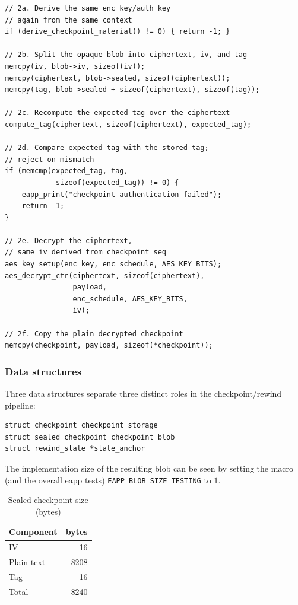 \documentclass[11pt,a4paper]{report}
\begin{document}
\begin{verbatim}
// 2a. Derive the same enc_key/auth_key 
// again from the same context
if (derive_checkpoint_material() != 0) { return -1; }

// 2b. Split the opaque blob into ciphertext, iv, and tag
memcpy(iv, blob->iv, sizeof(iv));
memcpy(ciphertext, blob->sealed, sizeof(ciphertext));
memcpy(tag, blob->sealed + sizeof(ciphertext), sizeof(tag));

// 2c. Recompute the expected tag over the ciphertext
compute_tag(ciphertext, sizeof(ciphertext), expected_tag);

// 2d. Compare expected tag with the stored tag; 
// reject on mismatch
if (memcmp(expected_tag, tag, 
            sizeof(expected_tag)) != 0) {
    eapp_print("checkpoint authentication failed");
    return -1;
}

// 2e. Decrypt the ciphertext,
// same iv derived from checkpoint_seq
aes_key_setup(enc_key, enc_schedule, AES_KEY_BITS);
aes_decrypt_ctr(ciphertext, sizeof(ciphertext),  
                payload, 
                enc_schedule, AES_KEY_BITS, 
                iv);

// 2f. Copy the plain decrypted checkpoint 
memcpy(checkpoint, payload, sizeof(*checkpoint));
\end{verbatim}

\subsubsection{Data structures}
\label{subsub:data-struct}
Three data structures separate three distinct roles in the checkpoint/rewind
pipeline:

\begin{verbatim}
struct checkpoint checkpoint_storage
struct sealed_checkpoint checkpoint_blob
struct rewind_state *state_anchor
\end{verbatim}
The implementation size of the resulting blob can be seen by setting the macro (and the overall eapp tests)
\verb|EAPP_BLOB_SIZE_TESTING| to $1$.

\begin{table}[H]
    \centering
    \label{tab:seal_cp_size}
    \begin{tabular}{|l|r|}
        \hline
        Component & bytes \\
        \hline
        IV & 16 \\
        Plain text & 8208 \\
        Tag & 16 \\
        Total & 8240\\
        \hline
    \end{tabular}
    \caption{Sealed checkpoint size (bytes)}
\end{table}
\end{document}
